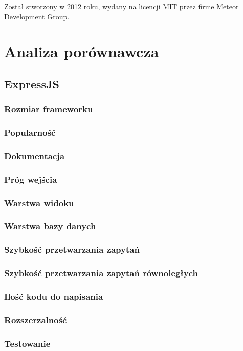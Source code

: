 \documentclass[12pt]{report}
\begin{document}
    Został stworzony w 2012 roku, wydany na licencji MIT przez firme Meteor Development Group.

\chapter{Analiza porównawcza}

  \section{ExpressJS}
    \subsection{Rozmiar frameworku}
    \subsection{Popularność}
    \subsection{Dokumentacja}
    \subsection{Próg wejścia}
    \subsection{Warstwa widoku}
    \subsection{Warstwa bazy danych}
    \subsection{Szybkość przetwarzania zapytań}
    \subsection{Szybkość przetwarzania zapytań równoległych}
    \subsection{Ilość kodu do napisania}
    \subsection{Rozszerzalność}
    \subsection{Testowanie}
\end{document}
